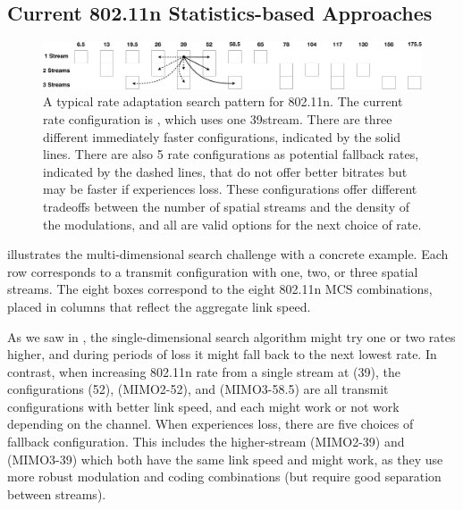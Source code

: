 \subsection{Current 802.11n Statistics-based Approaches}
\begin{figure}[t]
      \centering
      \includegraphics[width=\textwidth]{figures/approach/search_11n.pdf}
      \caption[Rate adaptation search pattern for 802.11n]{\label{fig:search_11n}A typical rate adaptation search pattern for 802.11n. The current rate configuration is , which uses one 39\Mbps stream. There are three different immediately faster configurations, indicated by the solid lines.
      There are also 5 rate configurations as potential fallback rates, indicated by the dashed lines, that do not offer better bitrates but may be faster if  experiences loss. These configurations offer different tradeoffs between the number of spatial streams and the density of the modulations, and all are valid options for the next choice of rate.}
\end{figure}
 illustrates the multi-dimensional search challenge with a concrete example. Each row corresponds to a transmit configuration with one, two, or three spatial streams. The eight boxes correspond to the eight 802.11n MCS combinations, placed in columns that reflect the aggregate link speed.

As we saw in , the single-dimensional search algorithm might try one or two rates higher, and during periods of loss it might fall back to the next lowest rate. In contrast, when increasing 802.11n rate from a single stream at  (39\Mbps), the configurations  (52\Mbps),  (MIMO2-52\Mbps), and  (MIMO3-58.5\Mbps) are all transmit configurations with better link speed, and each might work or not work depending on the channel. When  experiences loss, there are five choices of fallback configuration. This includes the higher-stream  (MIMO2-39\Mbps) and  (MIMO3-39\Mbps) which both have the same link speed and might work, as they use more robust modulation and coding combinations (but require good separation between streams).

